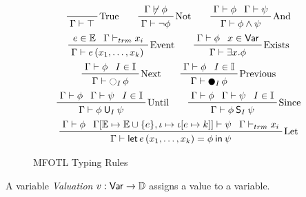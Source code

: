 \begin{figure}
    \begin{gather*}
        \prftree[r]{True}
            {}
            {\Gamma \vdash \top} \qquad
        \prftree[r]{Not}
            {\Gamma \not\vdash \phi}
            {\Gamma \vdash \neg \phi} \qquad
        \prftree[r]{And}
            {\Gamma \vdash \phi}{\Gamma \vdash \psi}
            {\Gamma \vdash \phi \wedge \psi} \\
        \prftree[r]{Event}
            {e \in \Events}
            {\Gamma \vdash_{trm} x_i}
            {\Gamma \vdash e\left(x_1, \dots, x_k\right)} \qquad
        \prftree[r]{Exists}
            {\Gamma \vdash \phi}{x \in \Variables}
            {\Gamma \vdash \exists x. \phi} \\
        \prftree[r]{Next}
            {\Gamma \vdash \phi}{I \in \Intervals}
            {\Gamma \vdash \Next_I \phi} \qquad
        \prftree[r]{Previous}
            {\Gamma \vdash \phi}{I \in \Intervals}
            {\Gamma \vdash \Prev_I \phi} \\
        \prftree[r]{Until}
            {\Gamma \vdash \phi}{\Gamma \vdash \psi}{I \in \Intervals}
            {\Gamma \vdash \phi \UUntil_I \psi} \qquad
        \prftree[r]{Since}
            {\Gamma \vdash \phi}{\Gamma \vdash \psi}{I \in \Intervals}
            {\Gamma \vdash \phi \Since_I \psi} \\
        \prftree[r]{Let}
            {\Gamma \vdash \phi}
            {\Gamma
                [\Events \mapsto \Events \cup \lbrace e \rbrace,
                \iota \mapsto \iota[e \mapsto k]]
                \vdash \psi}
            {\Gamma \vdash_{trm} x_i}
            {\Gamma \vdash \LLet{e\left(x_1, \dots, x_k \right)}{\phi}{\psi}}
    \end{gather*}
    \vspace{-2em}
    \caption{MFOTL Typing Rules \label{fig:mfotl-typing-rules}}
\end{figure}


\begin{definition}
    \label{def:mfotl-valuation}
    A variable \emph{Valuation} $v: \mathsf{Var} \to \mathbb{D}$
    assigns a value to a variable.
\end{definition}

